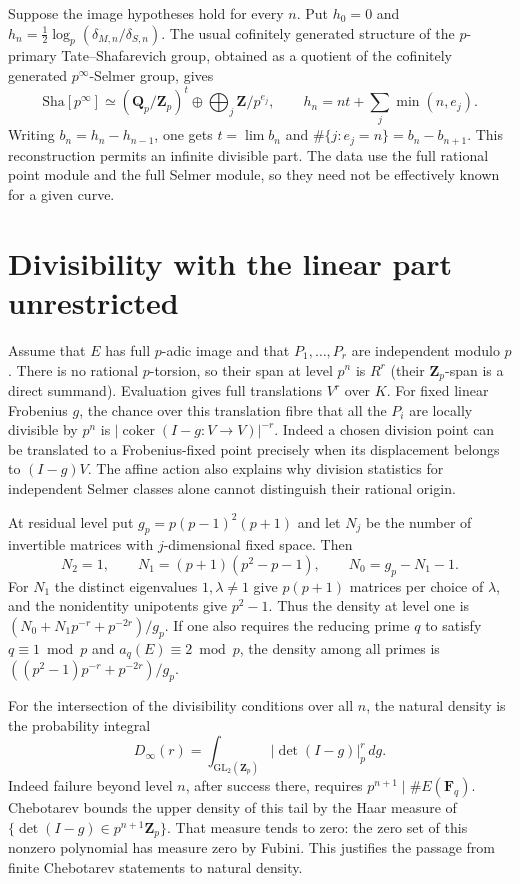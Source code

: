 \documentclass[11pt]{article}
\newcommand{\Q}{\mathbf Q}
\newcommand{\Z}{\mathbf Z}
\newcommand{\F}{\mathbf F}
\newcommand{\Sha}{\mathrm{Sha}}
\newcommand{\GL}{\mathrm{GL}}
\begin{document}
Suppose the image hypotheses hold for every $n$. Put
$h_0=0$ and $h_n=\tfrac12\log_p(\delta_{M,n}/\delta_{S,n})$.
The usual cofinitely generated structure of the $p$-primary
Tate--Shafarevich group, obtained as a quotient of the cofinitely
generated $p^\infty$-Selmer group, gives
\[
 \Sha[p^\infty]\simeq(\Q_p/\Z_p)^t\oplus
 \bigoplus_j\Z/p^{e_j},\qquad
 h_n=nt+\sum_j\min(n,e_j).
\]
Writing $b_n=h_n-h_{n-1}$, one gets $t=\lim b_n$ and
$\#\{j:e_j=n\}=b_n-b_{n+1}$. This reconstruction permits an infinite
divisible part. The data use the full rational point module and the full
Selmer module, so they need not be effectively known for a given curve.

\section{Divisibility with the linear part unrestricted}
Assume that $E$ has full $p$-adic image and that $P_1,\ldots,P_r$ are
independent modulo $p$. There is no rational $p$-torsion, so their
span at level $p^n$ is $R^r$ (their $\Z_p$-span is a direct summand).
Evaluation gives full translations $V^r$ over $K$. For fixed linear
Frobenius $g$, the chance over this translation fibre that
all the $P_i$ are locally divisible by $p^n$ is
$|\operatorname{coker}(I-g:V\to V)|^{-r}$. Indeed a chosen division
point can be translated to a Frobenius-fixed point precisely when
its displacement belongs to $(I-g)V$. The affine action also explains
why division statistics for independent Selmer classes alone cannot
distinguish their rational origin.

At residual level put $g_p=p(p-1)^2(p+1)$ and let $N_j$ be the number
of invertible matrices with $j$-dimensional fixed space. Then
\[
 N_2=1,\qquad N_1=(p+1)(p^2-p-1),\qquad N_0=g_p-N_1-1.
\]
For $N_1$ the distinct eigenvalues $1,\lambda\ne1$ give $p(p+1)$
matrices per choice of $\lambda$, and the nonidentity unipotents give
$p^2-1$. Thus the density at level one is
$(N_0+N_1p^{-r}+p^{-2r})/g_p$. If one also requires the reducing prime
$q$ to satisfy $q\equiv1\bmod p$ and $a_q(E)\equiv2\bmod p$, the
density among all primes is $((p^2-1)p^{-r}+p^{-2r})/g_p$.

For the intersection of the divisibility conditions over all $n$, the
natural density is the probability integral
\[
 D_\infty(r)=\int_{\GL_2(\Z_p)}|\det(I-g)|_p^r\,dg.
\]
Indeed failure beyond level $n$, after success there, requires
$p^{n+1}\mid \#E(\F_q)$. Chebotarev bounds the upper density of
this tail by the Haar measure of $\{\det(I-g)\in p^{n+1}\Z_p\}$.
That measure tends to zero: the zero set of this nonzero polynomial
has measure zero by Fubini. This justifies the passage from finite
Chebotarev statements to natural density.
\end{document}
